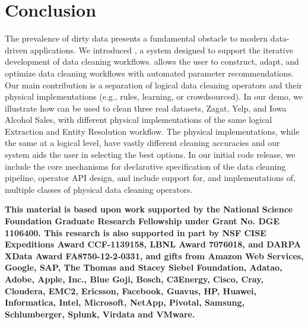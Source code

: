 \section{Conclusion}
The prevalence of dirty data presents a fundamental obstacle to modern data-driven applications.
We introduced \sys, a system designed to support the iterative development of data cleaning workflows.
\sys allows the user to construct, adapt, and optimize data cleaning workflows with automated parameter recommendations.
Our main contribution is a separation of logical data cleaning operators and their physical implementations (e.g., rules, learning, or crowdsourced).
In our demo, we illustrate how \sys can be used to clean three real datasets, Zagat, Yelp, and Iowa Alcohol Sales, with different physical implementations of the same logical Extraction and Entity Resolution workflow.
The physical implementations, while the same at a logical level, have vastly different cleaning accuracies and our system aids the user in selecting the best options.
In our initial code release, we include the core mechanisms for declarative specification of the data cleaning pipeline, operator API design, and include support for, and implementations of, multiple classes of physical data cleaning operators.

\vspace{0.5em}

\textbf{This material is based upon work supported by the National Science Foundation Graduate Research Fellowship under Grant No. DGE 1106400. This research is also supported in part by NSF CISE Expeditions Award CCF-1139158, LBNL Award 7076018, and DARPA XData Award FA8750-12-2-0331, and gifts from Amazon Web Services, Google, SAP, The Thomas and Stacey Siebel Foundation, Adatao, Adobe, Apple, Inc., Blue Goji, Bosch, C3Energy, Cisco, Cray, Cloudera, EMC2, Ericsson, Facebook, Guavus, HP, Huawei, Informatica, Intel, Microsoft, NetApp, Pivotal, Samsung, Schlumberger, Splunk, Virdata and VMware.}